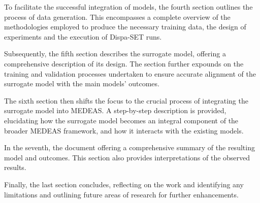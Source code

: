 To facilitate the successful integration of models, the fourth section outlines the process of data generation. This encompasses a complete overview of the methodologies employed to produce the necessary training data, the design of experiments and the execution of Dispa-SET runs.

Subsequently, the fifth section describes the surrogate model, offering a comprehensive description of its design. The section further expounds on the training and validation processes undertaken to ensure accurate alignment of the surrogate model with the main models' outcomes.

The sixth section then shifts the focus to the crucial process of integrating the surrogate model into MEDEAS. A step-by-step description is provided, elucidating how the surrogate model becomes an integral component of the broader MEDEAS framework, and how it interacts with the existing models.

In the seventh, the document offering a comprehensive summary of the resulting model and outcomes. This section also provides interpretations of the observed results.

Finally, the last section concludes, reflecting on the work and identifying any limitations and outlining future areas of research for further enhancements. 



